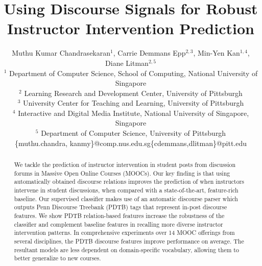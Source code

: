 \documentclass[letterpaper]{article}
\begin{document}
%
\title{Using Discourse Signals for Robust Instructor Intervention Prediction}
\author{Muthu Kumar Chandrasekaran$^1$, Carrie Demmans Epp$^{2,3}$, 
		 Min-Yen Kan$^{1,4}$, Diane Litman$^{2,5}$ \\ 
$^1$ Department of Computer Science, School of Computing, National University of Singapore\\
$^2$ Learning Research and Development Center, University of Pittsburgh\\
$^3$ University Center for Teaching and Learning, University of Pittsburgh\\
$^4$ Interactive and Digital Media Institute, National University of Singapore, Singapore\\
$^5$ Department of Computer Science, University of Pittsburgh\\
\{muthu.chandra, kanmy\}@comp.nus.edu.sg\hspace{1cm}\{cdemmans,dlitman\}@pitt.edu
}

\maketitle
\begin{abstract}
We tackle the prediction of instructor intervention in student posts from 
discussion forums %
in Massive Open Online Courses (MOOCs). Our key finding is 
that using automatically obtained discourse relations improves the 
prediction of when instructors intervene in student discussions, when compared 
with a state-of-the-art, feature-rich baseline. Our supervised classifier makes 
use of an automatic discourse parser which outputs Penn Discourse 
Treebank (PDTB) tags that represent in-post discourse features. 
We show %
PDTB relation-based 
features increase the robustness of the classifier and complement baseline 
features in recalling more diverse instructor intervention patterns. In 
comprehensive experiments over 14 %
MOOC offerings from %
several disciplines, the PDTB discourse features improve performance on average. 
The resultant models are less dependent on domain-specific vocabulary, allowing 
them to better generalize to new courses.
\end{abstract}
\end{document}
